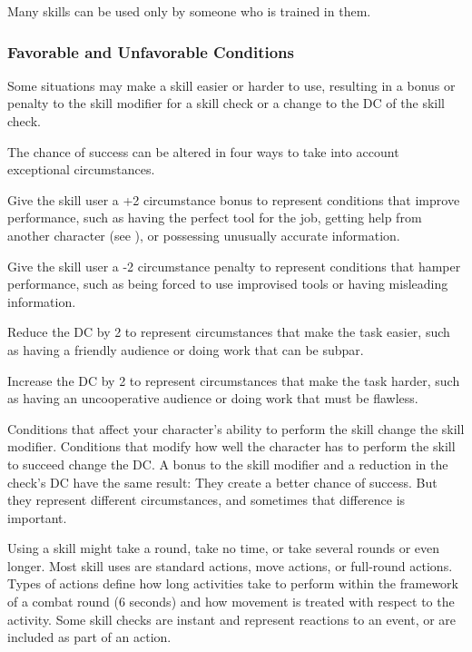Many skills can be used only by someone who is trained in them.

\subsubsection{Favorable and Unfavorable Conditions}

Some situations may make a skill easier or harder to use, resulting in a bonus 
or penalty to the skill modifier for a skill check or a change to the DC of the 
skill check.

The chance of success can be altered in four ways to take into account exceptional 
circumstances.

\begin{enumerate*}
\item Give the skill user a +2 circumstance bonus to represent conditions that improve 
performance, such as having the perfect tool for the job, getting help from another 
character (see ), or possessing unusually accurate information. 

\item Give the skill user a -2 circumstance penalty to represent conditions that hamper 
performance, such as being forced to use improvised tools or having misleading 
information.

\item Reduce the DC by 2 to represent circumstances that make the task easier, such 
as having a friendly audience or doing work that can be subpar.

\item Increase the DC by 2 to represent circumstances that make the task harder, such 
as having an uncooperative audience or doing work that must be flawless.
\end{enumerate*}

Conditions that affect your character's ability to perform the skill change the 
skill modifier. Conditions that modify how well the character has to perform the 
skill to succeed change the DC. A bonus to the skill modifier and a reduction in 
the check's DC have the same result: They create a better chance of success. But 
they represent different circumstances, and sometimes that difference is important.



Using a skill might take a round, take no time, or take several rounds or even 
longer. Most skill uses are standard actions, move actions, or full-round actions. 
Types of actions define how long activities take to perform within the framework 
of a combat round (6 seconds) and how movement is treated with respect to the activity. 
Some skill checks are instant and represent reactions to an event, or are included 
as part of an action.


